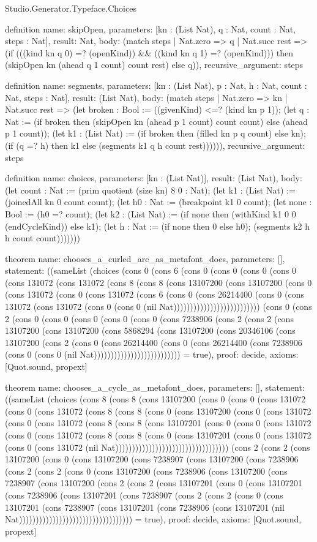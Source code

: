 \begin{lexlean}{Studio.Generator.Typeface.Choices}
\begin{semanticmodule}
definition{
  name: skipOpen,
  parameters: [kn : (List Nat), q : Nat, count : Nat, steps : Nat],
  result: Nat,
  body: (match steps
    | Nat.zero => q
    | Nat.succ rest => (if (((kind kn q 0) =? (openKind)) && ((kind kn q 1) =? (openKind))) then (skipOpen kn (ahead q 1 count) count rest) else q)),
  recursive_argument: steps
}

definition{
  name: segments,
  parameters: [kn : (List Nat), p : Nat, h : Nat, count : Nat, steps : Nat],
  result: (List Nat),
  body: (match steps
    | Nat.zero => kn
    | Nat.succ rest => (let broken : Bool := ((givenKind) <=? (kind kn p 1)); (let q : Nat := (if broken then (skipOpen kn (ahead p 1 count) count count) else (ahead p 1 count)); (let k1 : (List Nat) := (if broken then (filled kn p q count) else kn); (if (q =? h) then k1 else (segments k1 q h count rest)))))),
  recursive_argument: steps
}

definition{
  name: choices,
  parameters: [kn : (List Nat)],
  result: (List Nat),
  body: (let count : Nat := (prim quotient (size kn) 8 0 : Nat); (let k1 : (List Nat) := (joinedAll kn 0 count count); (let h0 : Nat := (breakpoint k1 0 count); (let none : Bool := (h0 =? count); (let k2 : (List Nat) := (if none then (withKind k1 0 0 (endCycleKind)) else k1); (let h : Nat := (if none then 0 else h0); (segments k2 h h count count)))))))
}

theorem{
  name: chooses_a_curled_arc_as_metafont_does,
  parameters: [],
  statement: ((sameList (choices (cons 0 (cons 6 (cons 0 (cons 0 (cons 0 (cons 0 (cons 131072 (cons 131072 (cons 8 (cons 8 (cons 13107200 (cons 13107200 (cons 0 (cons 131072 (cons 0 (cons 131072 (cons 6 (cons 0 (cons 26214400 (cons 0 (cons 131072 (cons 131072 (cons 0 (cons 0 (nil Nat)))))))))))))))))))))))))) (cons 0 (cons 2 (cons 0 (cons 0 (cons 0 (cons 0 (cons 0 (cons 7238906 (cons 2 (cons 2 (cons 13107200 (cons 13107200 (cons 5868294 (cons 13107200 (cons 20346106 (cons 13107200 (cons 2 (cons 0 (cons 26214400 (cons 0 (cons 26214400 (cons 7238906 (cons 0 (cons 0 (nil Nat)))))))))))))))))))))))))) = true),
  proof: decide{},
  axioms: [Quot.sound, propext]
}

theorem{
  name: chooses_a_cycle_as_metafont_does,
  parameters: [],
  statement: ((sameList (choices (cons 8 (cons 8 (cons 13107200 (cons 0 (cons 0 (cons 131072 (cons 0 (cons 131072 (cons 8 (cons 8 (cons 0 (cons 13107200 (cons 0 (cons 131072 (cons 0 (cons 131072 (cons 8 (cons 8 (cons 13107201 (cons 0 (cons 0 (cons 131072 (cons 0 (cons 131072 (cons 8 (cons 8 (cons 0 (cons 13107201 (cons 0 (cons 131072 (cons 0 (cons 131072 (nil Nat)))))))))))))))))))))))))))))))))) (cons 2 (cons 2 (cons 13107200 (cons 0 (cons 13107200 (cons 7238907 (cons 13107200 (cons 7238906 (cons 2 (cons 2 (cons 0 (cons 13107200 (cons 7238906 (cons 13107200 (cons 7238907 (cons 13107200 (cons 2 (cons 2 (cons 13107201 (cons 0 (cons 13107201 (cons 7238906 (cons 13107201 (cons 7238907 (cons 2 (cons 2 (cons 0 (cons 13107201 (cons 7238907 (cons 13107201 (cons 7238906 (cons 13107201 (nil Nat)))))))))))))))))))))))))))))))))) = true),
  proof: decide{},
  axioms: [Quot.sound, propext]
}


\end{semanticmodule}
\end{lexlean}
